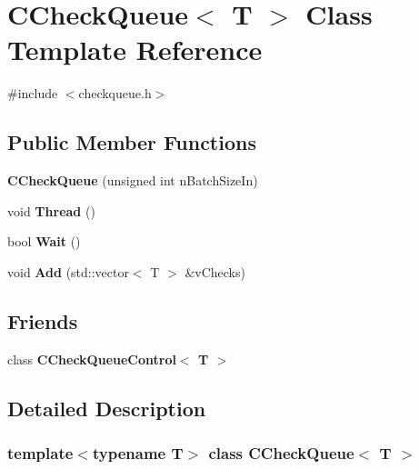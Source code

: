 \hypertarget{class_c_check_queue}{}\section{C\+Check\+Queue$<$ T $>$ Class Template Reference}
\label{class_c_check_queue}


{\ttfamily \#include $<$checkqueue.\+h$>$}

\subsection*{Public Member Functions}
\begin{DoxyCompactItemize}
\item 
\mbox{\label{class_c_check_queue_ad0e6a979f8433c05770350bc6b90a849}} 
{\bfseries C\+Check\+Queue} (unsigned int n\+Batch\+Size\+In)
\item 
\mbox{\label{class_c_check_queue_ad3602cd305b07612e634363b31c1d46c}} 
void {\bfseries Thread} ()
\item 
\mbox{\label{class_c_check_queue_a4ff3e0e8241491efa1803eeb3a53e7fa}} 
bool {\bfseries Wait} ()
\item 
\mbox{\label{class_c_check_queue_aee8e83bcdeef17740937e6c1dc84c478}} 
void {\bfseries Add} (std\+::vector$<$ T $>$ \&v\+Checks)
\end{DoxyCompactItemize}
\subsection*{Friends}
\begin{DoxyCompactItemize}
\item 
\mbox{\label{class_c_check_queue_a29e7010df2410e36f2aed87eae2053f2}} 
class {\bfseries C\+Check\+Queue\+Control$<$ T $>$}
\end{DoxyCompactItemize}


\subsection{Detailed Description}
\subsubsection*{template$<$typename T$>$\newline
class C\+Check\+Queue$<$ T $>$}

